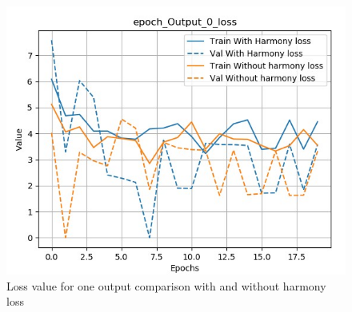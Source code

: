 \documentclass[12pt]{report}
\begin{document}
\begin{figure}[htbp]
\begin{minipage}{0.5 \textwidth}
\begin{center}
            \includegraphics[width=\textwidth]{images/experiences/harmony-rnn/loss-output-comparison-harmony.jpg}
            \caption{Loss value for one output comparison with and without harmony loss}
            \label{fig:loss-output-comparison-harmony}
        \end{center}
    \end{minipage}
\end{figure}
\end{document}
